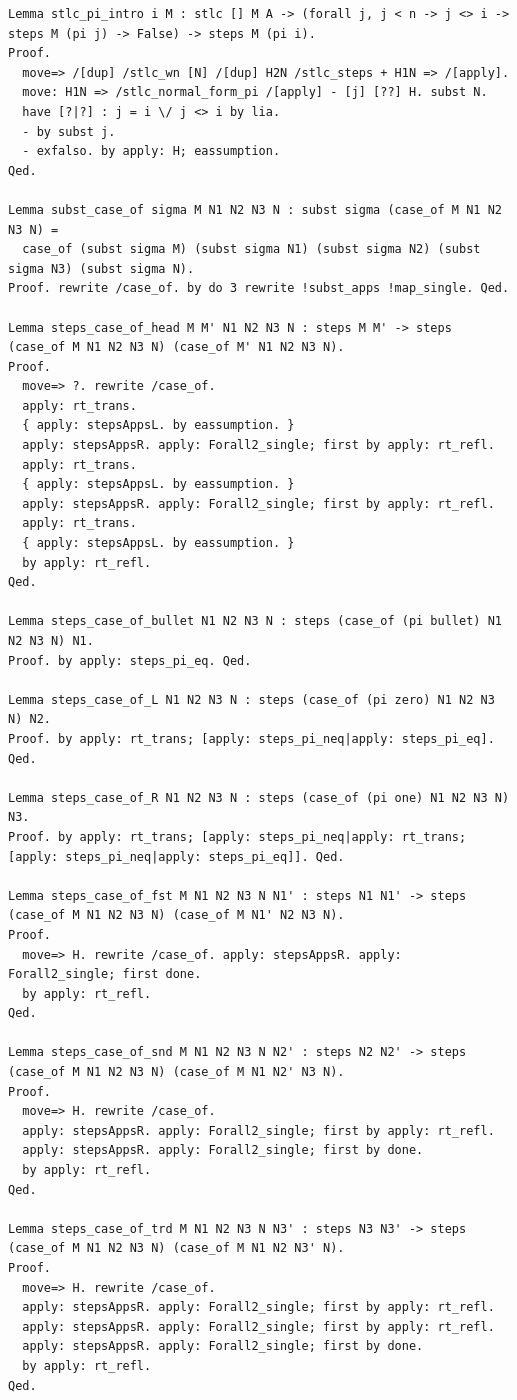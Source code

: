 \begin{lstlisting}
Lemma stlc_pi_intro i M : stlc [] M A -> (forall j, j < n -> j <> i -> steps M (pi j) -> False) -> steps M (pi i).
Proof.
  move=> /[dup] /stlc_wn [N] /[dup] H2N /stlc_steps + H1N => /[apply].
  move: H1N => /stlc_normal_form_pi /[apply] - [j] [??] H. subst N.
  have [?|?] : j = i \/ j <> i by lia.
  - by subst j.
  - exfalso. by apply: H; eassumption.
Qed.

Lemma subst_case_of sigma M N1 N2 N3 N : subst sigma (case_of M N1 N2 N3 N) =
  case_of (subst sigma M) (subst sigma N1) (subst sigma N2) (subst sigma N3) (subst sigma N).
Proof. rewrite /case_of. by do 3 rewrite !subst_apps !map_single. Qed.

Lemma steps_case_of_head M M' N1 N2 N3 N : steps M M' -> steps (case_of M N1 N2 N3 N) (case_of M' N1 N2 N3 N).
Proof.
  move=> ?. rewrite /case_of.
  apply: rt_trans.
  { apply: stepsAppsL. by eassumption. }
  apply: stepsAppsR. apply: Forall2_single; first by apply: rt_refl.
  apply: rt_trans.
  { apply: stepsAppsL. by eassumption. }
  apply: stepsAppsR. apply: Forall2_single; first by apply: rt_refl.
  apply: rt_trans.
  { apply: stepsAppsL. by eassumption. }
  by apply: rt_refl.
Qed.

Lemma steps_case_of_bullet N1 N2 N3 N : steps (case_of (pi bullet) N1 N2 N3 N) N1.
Proof. by apply: steps_pi_eq. Qed.

Lemma steps_case_of_L N1 N2 N3 N : steps (case_of (pi zero) N1 N2 N3 N) N2.
Proof. by apply: rt_trans; [apply: steps_pi_neq|apply: steps_pi_eq]. Qed.

Lemma steps_case_of_R N1 N2 N3 N : steps (case_of (pi one) N1 N2 N3 N) N3.
Proof. by apply: rt_trans; [apply: steps_pi_neq|apply: rt_trans; [apply: steps_pi_neq|apply: steps_pi_eq]]. Qed.

Lemma steps_case_of_fst M N1 N2 N3 N N1' : steps N1 N1' -> steps (case_of M N1 N2 N3 N) (case_of M N1' N2 N3 N).
Proof.
  move=> H. rewrite /case_of. apply: stepsAppsR. apply: Forall2_single; first done.
  by apply: rt_refl.
Qed.

Lemma steps_case_of_snd M N1 N2 N3 N N2' : steps N2 N2' -> steps (case_of M N1 N2 N3 N) (case_of M N1 N2' N3 N).
Proof.
  move=> H. rewrite /case_of.
  apply: stepsAppsR. apply: Forall2_single; first by apply: rt_refl.
  apply: stepsAppsR. apply: Forall2_single; first by done.
  by apply: rt_refl.
Qed.

Lemma steps_case_of_trd M N1 N2 N3 N N3' : steps N3 N3' -> steps (case_of M N1 N2 N3 N) (case_of M N1 N2 N3' N).
Proof.
  move=> H. rewrite /case_of.
  apply: stepsAppsR. apply: Forall2_single; first by apply: rt_refl.
  apply: stepsAppsR. apply: Forall2_single; first by apply: rt_refl.
  apply: stepsAppsR. apply: Forall2_single; first by done.
  by apply: rt_refl.
Qed.


\end{lstlisting}
